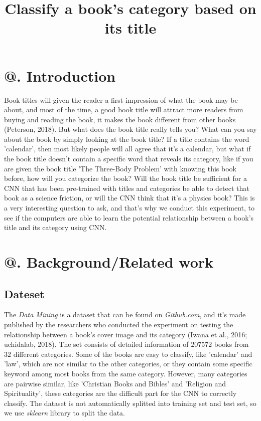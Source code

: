 \documentclass[jou,apacite, 10px]{apa6}
\title{Classify a book's category based on its title}
\makeatletter
\newcommand*{\rom}[1]{\expandafter\@slowromancap\romannumeral #1@}
\makeatother
\begin{document}
\maketitle    
                        
\section{\rom{1}. Introduction}
Book titles will given the reader a first impression of what the book may be about, and most of the time, a good book title will attract more readers from buying and reading the book, it makes the book different from other books (Peterson, 2018). But what does the book title really tells you? What can you say about the book by simply looking at the book title? If a title contains the word 'calendar', then most likely people will all agree that it's a calendar, but what if the book title doesn't contain a specific word that reveals its category, like if you are given the book title 'The Three-Body Problem' with knowing this book before, how will you categorize the book? Will the book title be sufficient for a CNN that has been pre-trained with titles and categories be able to detect that book as a science friction, or will the CNN think that it's a physics book? This is a very interesting question to ask, and that's why we conduct this experiment, to see if the computers are able to learn the potential relationship between a book's title and its category using CNN.

\section{\rom{2}. Background/Related work}

\subsection{Dateset}
The \textit{Data Mining} is a dataset that can be found on \textit{Github.com}, and it's made published by the researchers who conducted the experiment on testing the relationship between a book's cover image and its category (Iwana et al., 2016; uchidalab, 2018). The set consists of detailed information of $207572$ books from $32$ different categories. Some of the books are easy to classify, like 'calendar' and 'law', which are not similar to the other categories, or they contain some specific keyword among most books from the same category. However, many categories are pairwise similar, like 'Christian Books and Bibles' and 'Religion and Spirituality', these categories are the difficult part for the CNN to correctly classify. The dataset is not automatically splitted into training set and test set, so we use \textit{sklearn} library to split the data.
\end{document}
